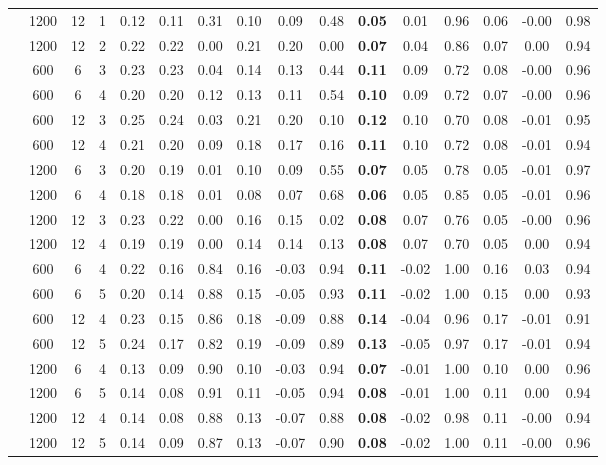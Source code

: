 \begin{table}[ht]
\begin{tabular}{||c|ccc||ccc|ccc|ccc|ccc}
   & 1200 & 12 & 1 & 0.12 & 0.11 & 0.31 & 0.10 & 0.09 & 0.48 & \bf 0.05 & 0.01 & 0.96 & 0.06 & -0.00 & 0.98 \\ 
   & 1200 & 12 & 2 & 0.22 & 0.22 & 0.00 & 0.21 & 0.20 & 0.00 & \bf 0.07 & 0.04 & 0.86 & 0.07 & 0.00 & 0.94 \\ 
   \hline
 & 600 & 6 & 3 & 0.23 & 0.23 & 0.04 & 0.14 & 0.13 & 0.44 & \bf 0.11 & 0.09 & 0.72 & 0.08 & -0.00 & 0.96 \\ 
   & 600 & 6 & 4 & 0.20 & 0.20 & 0.12 & 0.13 & 0.11 & 0.54 & \bf 0.10 & 0.09 & 0.72 & 0.07 & -0.00 & 0.96 \\ 
   & 600 & 12 & 3 & 0.25 & 0.24 & 0.03 & 0.21 & 0.20 & 0.10 & \bf 0.12 & 0.10 & 0.70 & 0.08 & -0.01 & 0.95 \\ 
   & 600 & 12 & 4 & 0.21 & 0.20 & 0.09 & 0.18 & 0.17 & 0.16 & \bf 0.11 & 0.10 & 0.72 & 0.08 & -0.01 & 0.94 \\ 
   & 1200 & 6 & 3 & 0.20 & 0.19 & 0.01 & 0.10 & 0.09 & 0.55 & \bf 0.07 & 0.05 & 0.78 & 0.05 & -0.01 & 0.97 \\ 
   & 1200 & 6 & 4 & 0.18 & 0.18 & 0.01 & 0.08 & 0.07 & 0.68 & \bf 0.06 & 0.05 & 0.85 & 0.05 & -0.01 & 0.96 \\ 
   & 1200 & 12 & 3 & 0.23 & 0.22 & 0.00 & 0.16 & 0.15 & 0.02 & \bf 0.08 & 0.07 & 0.76 & 0.05 & -0.00 & 0.96 \\ 
   & 1200 & 12 & 4 & 0.19 & 0.19 & 0.00 & 0.14 & 0.14 & 0.13 & \bf 0.08 & 0.07 & 0.70 & 0.05 & 0.00 & 0.94 \\ 
   \hline
 & 600 & 6 & 4 & 0.22 & 0.16 & 0.84 & 0.16 & -0.03 & 0.94 & \bf 0.11 & -0.02 & 1.00 & 0.16 & 0.03 & 0.94 \\ 
   & 600 & 6 & 5 & 0.20 & 0.14 & 0.88 & 0.15 & -0.05 & 0.93 & \bf 0.11 & -0.02 & 1.00 & 0.15 & 0.00 & 0.93 \\ 
   & 600 & 12 & 4 & 0.23 & 0.15 & 0.86 & 0.18 & -0.09 & 0.88 & \bf 0.14 & -0.04 & 0.96 & 0.17 & -0.01 & 0.91 \\ 
   & 600 & 12 & 5 & 0.24 & 0.17 & 0.82 & 0.19 & -0.09 & 0.89 & \bf 0.13 & -0.05 & 0.97 & 0.17 & -0.01 & 0.94 \\ 
   & 1200 & 6 & 4 & 0.13 & 0.09 & 0.90 & 0.10 & -0.03 & 0.94 & \bf 0.07 & -0.01 & 1.00 & 0.10 & 0.00 & 0.96 \\ 
   & 1200 & 6 & 5 & 0.14 & 0.08 & 0.91 & 0.11 & -0.05 & 0.94 & \bf 0.08 & -0.01 & 1.00 & 0.11 & 0.00 & 0.94 \\ 
   & 1200 & 12 & 4 & 0.14 & 0.08 & 0.88 & 0.13 & -0.07 & 0.88 & \bf 0.08 & -0.02 & 0.98 & 0.11 & -0.00 & 0.94 \\ 
   & 1200 & 12 & 5 & 0.14 & 0.09 & 0.87 & 0.13 & -0.07 & 0.90 & \bf 0.08 & -0.02 & 1.00 & 0.11 & -0.00 & 0.96 \\ 
   \hline
\hline
\end{tabular}
\end{table}
